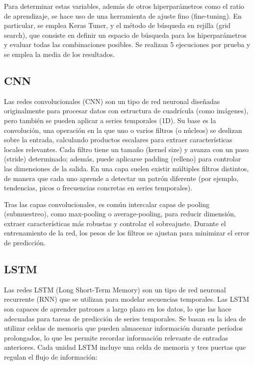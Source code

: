 Para determinar estas variables, además de otros hiperparámetros como el ratio de aprendizaje, se hace uso de una herramienta de ajuste fino (fine-tuning). En particular, se emplea Keras Tuner, y el método de búsqueda
en rejilla (grid search), que consiste en definir un espacio de búsqueda para los hiperparámetros y evaluar todas las combinaciones posibles. Se realizan 5 ejecuciones por prueba y se 
emplea la media de los resultados.

\subsection{CNN}
Las redes convolucionales (CNN) son un tipo de red neuronal diseñadas originalmente para procesar datos con estructura de cuadrícula (como imágenes), pero también se pueden aplicar a series temporales (1D).
Su base es la convolución, una operación en la que uno o varios filtros (o núcleos) se deslizan sobre la entrada, calculando productos escalares para extraer características locales relevantes.
Cada filtro tiene un tamaño (kernel size) y avanza con un paso (stride) determinado; además, puede aplicarse padding (relleno) para controlar las dimensiones de la salida.
En una capa suelen existir múltiples filtros distintos, de manera que cada uno aprende a detectar un patrón diferente (por ejemplo, tendencias, picos o frecuencias concretas en series temporales).

Tras las capas convolucionales, es común intercalar capas de pooling (submuestreo), como max-pooling o average-pooling, para reducir dimensión, extraer características más robustas y controlar el sobreajuste.
Durante el entrenamiento de la red, los pesos de los filtros se ajustan para minimizar el error de predicción.

\subsection{LSTM}
Las redes LSTM (Long Short-Term Memory) son un tipo de red neuronal recurrente (RNN) que se utilizan para modelar secuencias temporales.
Las LSTM son capaces de aprender patrones a largo plazo en los datos, lo que las hace adecuadas para tareas de predicción de series temporales.
Se basan en la idea de utilizar celdas de memoria que pueden almacenar información durante períodos prolongados, lo que les permite recordar información relevante de entradas anteriores.
Cada unidad LSTM incluye una celda de memoria y tres puertas que regulan el flujo de información:

